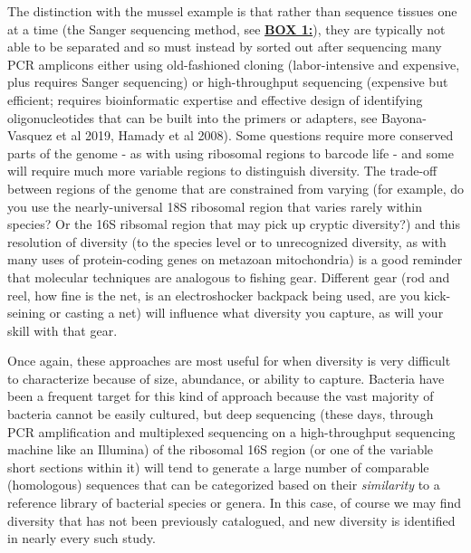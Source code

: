 \documentclass[
]{article}
\begin{document}
The distinction with the mussel example is that rather than sequence
tissues one at a time (the Sanger sequencing method, see
\protect\hyperlink{Box1}{\textbf{BOX 1:}}), they are typically not able
to be separated and so must instead by sorted out after sequencing many
PCR amplicons either using old-fashioned cloning (labor-intensive and
expensive, plus requires Sanger sequencing) or high-throughput
sequencing (expensive but efficient; requires bioinformatic expertise
and effective design of identifying oligonucleotides that can be built
into the primers or adapters, see Bayona-Vasquez et al 2019, Hamady et
al 2008). Some questions require more conserved parts of the genome - as
with using ribosomal regions to barcode life - and some will require
much more variable regions to distinguish diversity. The trade-off
between regions of the genome that are constrained from varying (for
example, do you use the nearly-universal 18S ribosomal region that
varies rarely within species? Or the 16S ribsomal region that may pick
up cryptic diversity?) and this resolution of diversity (to the species
level or to unrecognized diversity, as with many uses of protein-coding
genes on metazoan mitochondria) is a good reminder that molecular
techniques are analogous to fishing gear. Different gear (rod and reel,
how fine is the net, is an electroshocker backpack being used, are you
kick-seining or casting a net) will influence what diversity you
capture, as will your skill with that gear.

Once again, these approaches are most useful for when diversity is very
difficult to characterize because of size, abundance, or ability to
capture. Bacteria have been a frequent target for this kind of approach
because the vast majority of bacteria cannot be easily cultured, but
deep sequencing (these days, through PCR amplification and multiplexed
sequencing on a high-throughput sequencing machine like an Illumina) of
the ribosomal 16S region (or one of the variable short sections within
it) will tend to generate a large number of comparable (homologous)
sequences that can be categorized based on their \emph{similarity} to a
reference library of bacterial species or genera. In this case, of
course we may find diversity that has not been previously catalogued,
and new diversity is identified in nearly every such study.
\end{document}
